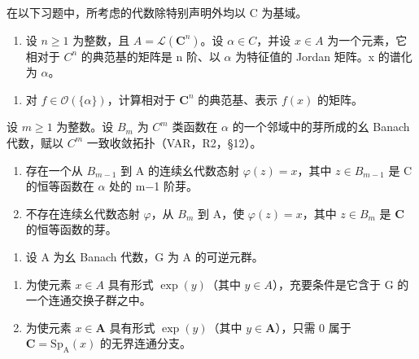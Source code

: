 
在以下习题中，所考虑的代数除特别声明外均以 C 为基域。

\begin{enumerate}
\def\labelenumi{\arabic{enumi})}
\tightlist
\item
  设 \(n \geqslant 1\) 为整数，且 \(A = \mathcal{L}(\mathbf{C}^{n})\)。设 \(\alpha \in C\)，并设 \(x \in A\) 为一个元素，它相对于 \(C^{n}\) 的典范基的矩阵是 n 阶、以 \(\alpha\) 为特征值的 Jordan 矩阵。x 的谱化为 \(\alpha\)。
\end{enumerate}

\begin{enumerate}
\def\labelenumi{\alph{enumi})}
\tightlist
\item
  对 \(f \in \mathcal{O}(\{\alpha\})\)，计算相对于 \(\mathbf{C}^n\) 的典范基、表示 \(f(x)\) 的矩阵。
\end{enumerate}

  设 \(m \geqslant 1\) 为整数。设 \(B_{m}\) 为 \(C^{m}\) 类函数在 \(\alpha\) 的一个邻域中的芽所成的幺 Banach 代数，赋以 \(C^{m}\) 一致收敛拓扑（VAR，R2，§12）。

\begin{enumerate}
\def\labelenumi{\alph{enumi})}
\setcounter{enumi}{1}
\item
  存在一个从 \(B_{m-1}\) 到 A 的连续幺代数态射 \(\varphi(z)=x\)，其中 \(z\in B_{m-1}\) 是 C 的恒等函数在 \(\alpha\) 处的 m−1 阶芽。
\item
  不存在连续幺代数态射 \(\varphi\)，从 \(B_m\) 到 A，使 \(\varphi(z) = x\)，其中 \(z \in B_m\) 是 \(\mathbf{C}\) 的恒等函数的芽。
\end{enumerate}

\begin{enumerate}
\def\labelenumi{\arabic{enumi})}
\setcounter{enumi}{1}
\tightlist
\item
  设 A 为幺 Banach 代数，G 为 A 的可逆元群。
\end{enumerate}

\begin{enumerate}
\def\labelenumi{\alph{enumi})}
\item
  为使元素 \(x \in A\) 具有形式 \(\exp(y)\)（其中 \(y \in A\)），充要条件是它含于 G 的一个连通交换子群之中。
\item
  为使元素 \(x \in \mathbf{A}\) 具有形式 \(\exp(y)\)（其中 \(y \in \mathbf{A}\)），只需 0 属于 \(\mathbf{C} = \mathrm{Sp}_{\mathrm{A}}(x)\) 的无界连通分支。
\end{enumerate}

